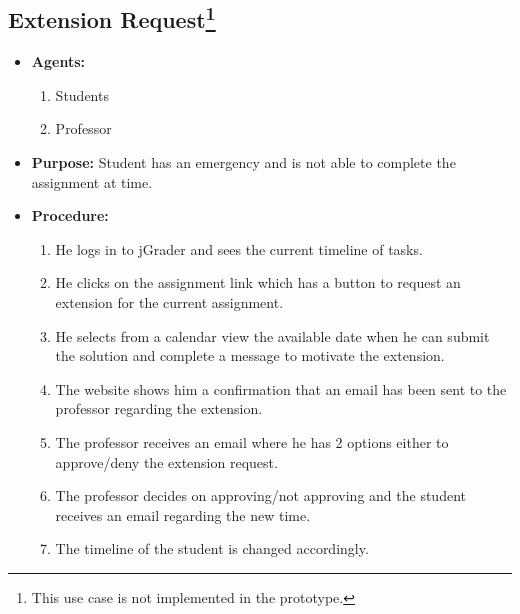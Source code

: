 \subsection{Extension Request\footnote{This use case is not implemented in the prototype. }}

\begin{itemize}
  \item \textbf{Agents:} \begin{enumerate}
    \item Students
    \item Professor
  \end{enumerate}
  \item \textbf{Purpose:} Student has an emergency and is not able to complete the assignment at time.
  \item \textbf{Procedure:}
  \begin{enumerate}
    \item He logs in to jGrader and sees the current timeline of tasks.
    \item He clicks on the assignment link which has a button to request an extension for the current assignment.
    \item He selects from a calendar view the available date when he can submit the solution and complete a message to motivate the extension.
    \item The website shows him a confirmation that an email has been sent to the professor regarding the extension.
    \item The professor receives an email where he has 2 options either to approve/deny the extension request.
    \item The professor decides on approving/not approving and the student receives an email regarding the new time.
    \item The timeline of the student is changed accordingly.
  \end{enumerate}
\end{itemize}
